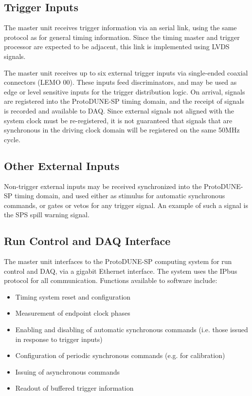 \documentclass[a4paper,11pt]{article}
\begin{document}
\subsection{Trigger Inputs}

The master unit receives trigger information via an serial link, using the same protocol as for general timing information. Since the timing master and trigger processor are expected to be adjacent, this link is implemented using LVDS signals.

The master unit receives up to six external trigger inputs via single-ended coaxial connectors (LEMO 00). These inputs feed discriminators, and may be used as edge or level sensitive inputs for the trigger distribution logic. On arrival, signals are registered into the ProtoDUNE-SP timing domain, and the receipt of signals is recorded and available to DAQ. Since external signals not aligned with the system clock must be re-registered, it is not guaranteed that signals that are synchronous in the driving clock domain will be registered on the same 50MHz cycle.

\subsection{Other External Inputs}

Non-trigger external inputs may be received synchronized into the ProtoDUNE-SP timing domain, and used either as stimulus for automatic synchronous commands, or gates or vetos for any trigger signal. An example of such a signal is the SPS spill warning signal.

\subsection{Run Control and DAQ Interface}

The master unit interfaces to the ProtoDUNE-SP computing system for run control and DAQ, via a gigabit Ethernet interface. The system uses the IPbus protocol for all communication. Functions available to software include:

\begin{itemize}
	\item Timing system reset and configuration
	\item Measurement of endpoint clock phases
	\item Enabling and disabling of automatic synchronous commands (i.e. those issued in response to trigger inputs)
	\item Configuration of periodic synchronous commands (e.g. for calibration)
	\item Issuing of asynchronous commands
	\item Readout of buffered trigger information
\end{itemize}
\end{document}
